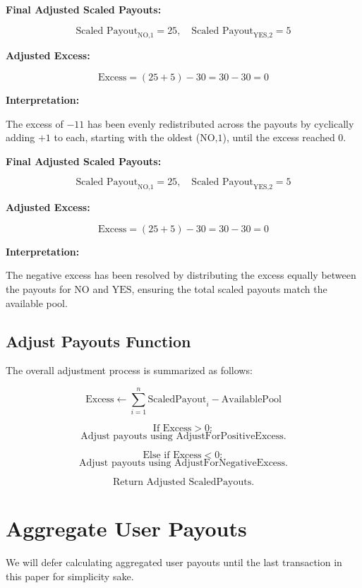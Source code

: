 \documentclass{article}
\begin{document}
\textbf{Final Adjusted Scaled Payouts:}

\[
\text{Scaled Payout}_{\text{NO,1}} = 25, \quad \text{Scaled Payout}_{\text{YES,2}} = 5
\]

\textbf{Adjusted Excess:}

\[
\text{Excess} = (25 + 5) - 30 = 30 - 30 = 0
\]

\textbf{Interpretation:}

The excess of \(-11\) has been evenly redistributed across the payouts by cyclically adding \(+1\) to each, starting with the oldest (\(\text{NO,1}\)), until the excess reached \(0\).

\textbf{Final Adjusted Scaled Payouts:}

\[
\text{Scaled Payout}_{\text{NO,1}} = 25, \quad \text{Scaled Payout}_{\text{YES,2}} = 5
\]

\textbf{Adjusted Excess:}

\[
\text{Excess} = (25 + 5) - 30 = 30 - 30 = 0
\]

\textbf{Interpretation:}

The negative excess has been resolved by distributing the excess equally between the payouts for \(\text{NO}\) and \(\text{YES}\), ensuring the total scaled payouts match the available pool.


\subsection*{Adjust Payouts Function}

The overall adjustment process is summarized as follows:

\[
\text{Excess} \gets \sum_{i=1}^{n} \text{ScaledPayout}_i - \text{AvailablePool}
\]

\[
\text{If Excess} > 0:
\]
\[
\text{Adjust payouts using AdjustForPositiveExcess.}
\]

\[
\text{Else if Excess} < 0:
\]
\[
\text{Adjust payouts using AdjustForNegativeExcess.}
\]

\[
\text{Return Adjusted ScaledPayouts.}
\]


\section*{Aggregate User Payouts}

We will defer calculating aggregated user payouts until the last transaction in this paper for simplicity sake.

\begin{center}
\end{center}
\end{document}
